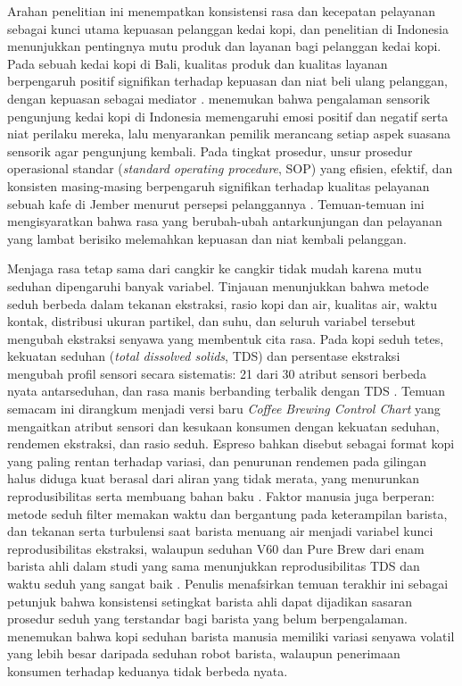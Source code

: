 Arahan penelitian ini menempatkan konsistensi rasa dan kecepatan pelayanan sebagai kunci utama kepuasan pelanggan kedai kopi, dan penelitian di Indonesia menunjukkan pentingnya mutu produk dan layanan bagi pelanggan kedai kopi. Pada sebuah kedai kopi di Bali, kualitas produk dan kualitas layanan berpengaruh positif signifikan terhadap kepuasan dan niat beli ulang pelanggan, dengan kepuasan sebagai mediator \citep*{natalia2023role}. \citet*{candra2022impact} menemukan bahwa pengalaman sensorik pengunjung kedai kopi di Indonesia memengaruhi emosi positif dan negatif serta niat perilaku mereka, lalu menyarankan pemilik merancang setiap aspek suasana sensorik agar pengunjung kembali. Pada tingkat prosedur, unsur prosedur operasional standar (\textit{standard operating procedure}, SOP) yang efisien, efektif, dan konsisten masing-masing berpengaruh signifikan terhadap kualitas pelayanan sebuah kafe di Jember menurut persepsi pelanggannya \citep*{chapitoline2024pengaruh}. Temuan-temuan ini mengisyaratkan bahwa rasa yang berubah-ubah antarkunjungan dan pelayanan yang lambat berisiko melemahkan kepuasan dan niat kembali pelanggan.

Menjaga rasa tetap sama dari cangkir ke cangkir tidak mudah karena mutu seduhan dipengaruhi banyak variabel. Tinjauan \citet*{cordoba2020coffee} menunjukkan bahwa metode seduh berbeda dalam tekanan ekstraksi, rasio kopi dan air, kualitas air, waktu kontak, distribusi ukuran partikel, dan suhu, dan seluruh variabel tersebut mengubah ekstraksi senyawa yang membentuk cita rasa. Pada kopi seduh tetes, kekuatan seduhan (\textit{total dissolved solids}, TDS) dan persentase ekstraksi mengubah profil sensori secara sistematis: 21 dari 30 atribut sensori berbeda nyata antarseduhan, dan rasa manis berbanding terbalik dengan TDS \citep*{frost2020effects}. Temuan semacam ini dirangkum \citet{guinard2023new} menjadi versi baru \textit{Coffee Brewing Control Chart} yang mengaitkan atribut sensori dan kesukaan konsumen dengan kekuatan seduhan, rendemen ekstraksi, dan rasio seduh. Espreso bahkan disebut sebagai format kopi yang paling rentan terhadap variasi, dan penurunan rendemen pada gilingan halus diduga kuat berasal dari aliran yang tidak merata, yang menurunkan reprodusibilitas serta membuang bahan baku \citep{cameron2020systematically}. Faktor manusia juga berperan: metode seduh filter memakan waktu dan bergantung pada keterampilan barista, dan tekanan serta turbulensi saat barista menuang air menjadi variabel kunci reprodusibilitas ekstraksi, walaupun seduhan V60 dan Pure Brew dari enam barista ahli dalam studi yang sama menunjukkan reprodusibilitas TDS dan waktu seduh yang sangat baik \citep{santanatoglia2023impact}. Penulis menafsirkan temuan terakhir ini sebagai petunjuk bahwa konsistensi setingkat barista ahli dapat dijadikan sasaran prosedur seduh yang terstandar bagi barista yang belum berpengalaman. \citet{park2023robot} menemukan bahwa kopi seduhan barista manusia memiliki variasi senyawa volatil yang lebih besar daripada seduhan robot barista, walaupun penerimaan konsumen terhadap keduanya tidak berbeda nyata.

